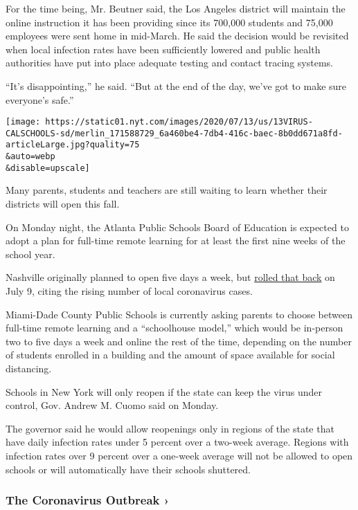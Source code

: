 For the time being, Mr. Beutner said, the Los Angeles district will
maintain the online instruction it has been providing since its 700,000
students and 75,000 employees were sent home in mid-March. He said the
decision would be revisited when local infection rates have been
sufficiently lowered and public health authorities have put into place
adequate testing and contact tracing systems.

``It's disappointing,'' he said. ``But at the end of the day, we've got
to make sure everyone's safe.''

\texttt{[image: https://static01.nyt.com/images/2020/07/13/us/13VIRUS-CALSCHOOLS-sd/merlin\_171588729\_6a460be4-7db4-416c-baec-8b0dd671a8fd-articleLarge.jpg?quality=75\\\&auto=webp\\\&disable=upscale]}

Many parents, students and teachers are still waiting to learn whether
their districts will open this fall.

On Monday night, the Atlanta Public Schools Board of Education is
expected to adopt a plan for full-time remote learning for at least the
first nine weeks of the school year.

Nashville originally planned to open five days a week, but
\href{https://www.tennessean.com/story/news/education/2020/07/09/metro-schools-academic-year-start-online-nashville-students/5383315002/}{rolled
that back} on July 9, citing the rising number of local coronavirus
cases.

Miami-Dade County Public Schools is currently asking parents to choose
between full-time remote learning and a ``schoolhouse model,'' which
would be in-person two to five days a week and online the rest of the
time, depending on the number of students enrolled in a building and the
amount of space available for social distancing.

Schools in New York will only reopen if the state can keep the virus
under control, Gov. Andrew M. Cuomo said on Monday.

The governor said he would allow reopenings only in regions of the state
that have daily infection rates under 5 percent over a two-week average.
Regions with infection rates over 9 percent over a one-week average will
not be allowed to open schools or will automatically have their schools
shuttered.

\href{https://www.nytimes.com/news-event/coronavirus?action=click\&pgtype=Article\&state=default\&region=MAIN_CONTENT_3\&context=storylines_faq}{}

\hypertarget{the-coronavirus-outbreak-}{%
\subsubsection{The Coronavirus Outbreak
›}\label{the-coronavirus-outbreak-}}

